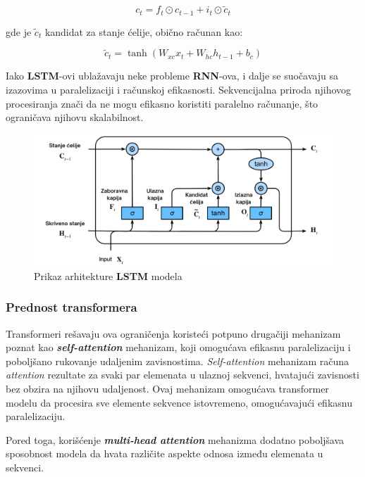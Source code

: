 \documentclass[12pt]{article}
\begin{document}
   \[ c_t = f_t \odot c_{t-1} + i_t \odot \tilde{c}_t \]

   gde je \( \tilde{c}_t \) kandidat za stanje ćelije, obično računan kao:

   \[ \tilde{c}_t = \tanh(W_{xc} x_t + W_{hc} h_{t-1} + b_c) \]

   Iako \textbf{LSTM}-ovi ublažavaju neke probleme \textbf{RNN}-ova, i dalje se suočavaju sa 
   izazovima u paralelizaciji i računskoj efikasnosti. Sekvencijalna priroda njihovog 
   procesiranja znači da ne mogu efikasno koristiti paralelno računanje, što ograničava njihovu 
   skalabilnost.

   \begin{figure}[h!]
      \centering
      \vspace{1.5cm} %
      \includegraphics[width=1\textwidth]{lstm.png}
      \caption{Prikaz arhitekture \textbf{LSTM} modela}
      \label{fig:lstm}
   \end{figure}

   \subsubsection{Prednost transformera}
   Transformeri rešavaju ova ograničenja koristeći potpuno drugačiji mehanizam poznat kao 
   \textbf{\textit{self-attention}} mehanizam, koji omogućava efikasnu paralelizaciju i poboljšano 
   rukovanje udaljenim zavisnostima. \textit{Self-attention} mehanizam računa \textit{attention} 
   rezultate za svaki par elemenata u ulaznoj sekvenci, hvatajući zavisnosti bez obzira na njihovu
   udaljenost. Ovaj mehanizam omogućava transformer modelu da procesira sve elemente sekvence
   istovremeno, omogućavajući efikasnu paralelizaciju. 
   
   Pored toga, korišćenje \textbf{\textit{multi-head attention}} mehanizma dodatno poboljšava 
   sposobnost modela da hvata različite aspekte odnosa između elemenata u sekvenci.
\end{document}
